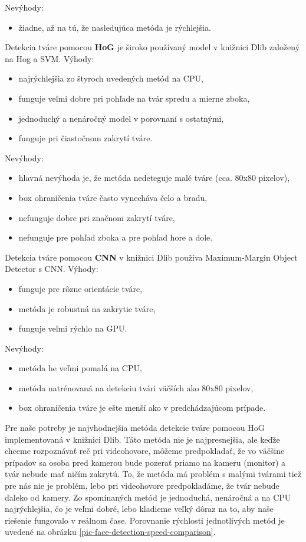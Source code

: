 Nevýhody:
\begin{itemize}
	\item žiadne, až na tú, že nasledujúca metóda je rýchlejšia.\\
\end{itemize}
Detekcia tváre pomocou \textbf{HoG} je široko používaný model v knižnici Dlib založený na Hog a SVM.
Výhody:
\begin{itemize}
	\item najrýchlejšia zo štyroch uvedených metód na CPU,
	\item funguje veľmi dobre pri pohľade na tvár spredu a mierne zboka,
	\item jednoduchý a nenáročný model v porovnaní s ostatnými,
	\item funguje pri čiastočnom zakrytí tváre.
\end{itemize}
Nevýhody:
\begin{itemize}
	\item hlavná nevýhoda je, že metóda nedeteguje malé tváre (cca. 80x80 pixelov),
	\item box ohraničenia tváre často vynecháva čelo a bradu,
	\item nefunguje dobre pri značnom zakrytí tváre,
	\item nefunguje pre pohľad zboka a pre pohľad hore a dole.\\
\end{itemize}
Detekcia tváre pomocou \textbf{CNN} v knižnici Dlib používa Maximum-Margin Object Detector s CNN.
Výhody:
\begin{itemize}
	\item funguje pre rôzne orientácie tváre,
	\item metóda je robustná na zakrytie tváre,
	\item funguje veľmi rýchlo na GPU.
\end{itemize}
Nevýhody:
\begin{itemize}
	\item metóda he veľmi pomalá na CPU,
	\item metóda natrénovaná na detekciu tvári väčších ako 80x80 pixelov,
	\item box ohraničenia tváre je ešte menší ako v predchádzajúcom prípade.\\
\end{itemize}

Pre naše potreby je najvhodnejšia metóda detekcie tváre pomocou HoG implementovaná v knižnici Dlib.
Táto metóda nie je najpresnejšia, ale keďže chceme rozpoznávať reč pri videohovore, môžeme predpokladať, že vo väčšine prípadov sa osoba pred kamerou bude pozerať priamo na kameru (monitor) a tvár  nebude mať ničím zakrytú.
To, že metóda má problém s malými tvárami tiež pre nás nie je problém, lebo pri videohovore predpokladáme, že tvár nebude ďaleko od kamery.
Zo spomínaných metód je jednoduchá, nenáročná a na CPU najrýchlejšia, čo je veľmi dobré, lebo kladieme veľký dôraz na to, aby naše riešenie fungovalo v reálnom čase.
Porovnanie rýchlosti jednotlivých metód je uvedené na obrázku \ref{pic-face-detection-speed-comparison}.

